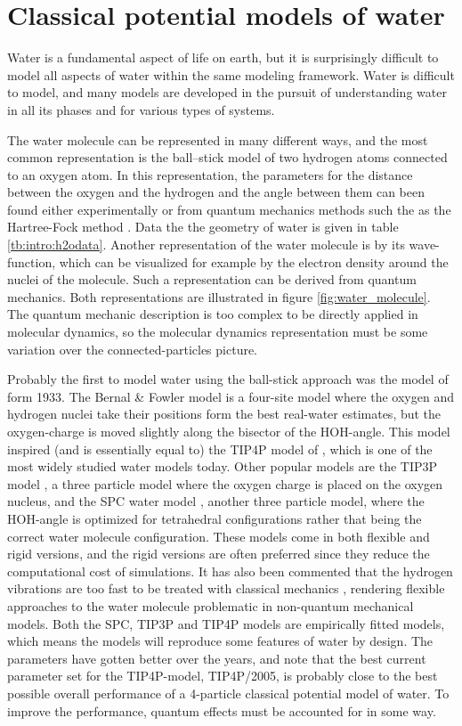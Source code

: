 \section{Classical potential models of water}
Water is a fundamental aspect of life on earth, but it is surprisingly difficult to model all aspects of water within the same modeling framework. Water is difficult to model, and many models are developed in the pursuit of understanding water in all its phases and for various types of systems.

The water molecule can be represented in many different ways, and the most common representation is the ball–stick model of two hydrogen atoms connected to an oxygen atom. In this representation, the parameters for the distance between the oxygen and the hydrogen and the angle between them can been found either experimentally or from quantum mechanics methods such the as the Hartree-Fock method \cite{fock1930naherungsmethode,slater1930note}. Data the the geometry of water is given in table \ref{tb:intro:h2odata}. Another representation of the water molecule is by its wave-function, which can be visualized for example by the electron density around the nuclei of the molecule. Such a representation can be derived from quantum mechanics. Both representations are illustrated in figure \ref{fig:water_molecule}. The quantum mechanic description is too complex to be directly applied in molecular dynamics, so the molecular dynamics representation must be some variation over the connected-particles picture. 

Probably the first to model water using the ball-stick approach was the model of \citet{bernal1933theory} form 1933. The Bernal \& Fowler model is a four-site model where the oxygen and hydrogen nuclei take their positions form the best real-water estimates, but the oxygen-charge is moved slightly along the bisector of the HOH-angle.  This model inspired (and is essentially equal to) the TIP4P model of \citet{Jorgensen1983}, which is one of the most widely studied water models today. Other popular models are the TIP3P model \cite{Jorgensen1983}, a three particle model where the oxygen charge is placed on the oxygen nucleus, and the SPC water model \cite{berendsen1981interaction}, another three particle model, where the HOH-angle is optimized for tetrahedral configurations rather that being the correct water molecule configuration. These models come in both flexible and rigid versions, and the rigid versions are often preferred since they reduce the computational cost of simulations. It has also been commented that the hydrogen vibrations are too fast to be treated with classical mechanics \cite{Vega2011}, rendering flexible approaches to the water molecule problematic in non-quantum mechanical models. Both the SPC, TIP3P and TIP4P models are empirically fitted models, which means the models will reproduce some features of water by design. The parameters have gotten better over the years, and \citet{Vega2011} note that the best current parameter set for the TIP4P-model, TIP4P/2005, is probably close to the best possible overall performance of a 4-particle classical potential model of water. To improve the performance, quantum effects must be accounted for in some way. 


